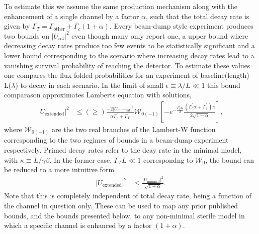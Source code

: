 \documentclass[11pt, a4paper]{article}
\begin{document}
To estimate this we assume the same production mechanism along with the
enhancement of a single channel by a factor $\alpha$, such that the total decay
rate is given by $\Gamma_T = \Gamma_\text{other}+\Gamma_c (1+\alpha)$. Every
beam-dump style experiment produces two bounds on $|U_{\alpha 4}|^2$ even
though many only report one, a upper bound where decreasing decay rates produce
too few events to be statistically significant and a lower bound corresponding
to the scenario where increasing decay rates lead to a vanishing survival
probability of reaching the detector. To estimate these values one compares the
flux folded probabilities for an experiment of baseline(length) L($\lambda$) to
decay in each scenario. In the limit of small $\epsilon \equiv \lambda/L
\ll 1$ this bound comparason approximates Lamberts equation with solutions, 
%
\begin{align*}
|U_\text{extended}|^2 &\leq (\geq) \frac{-2 |U_\text{minimal}|^2}{\alpha
\Gamma^\prime_c +\Gamma^\prime_T}
\mathcal{W}_{0(-1)}\left[-e^{-\frac{\Gamma^\prime_T \kappa}{2}}
\frac{(\Gamma^\prime_c \alpha + \Gamma^\prime_T)\kappa}{2\sqrt{1+\alpha}}
\right],
\end{align*}
% 
where $\mathcal{W}_{0(-1)}$ are the two real branches of the Lambert-W function
corresponding to the two regimes of bounds in a beam-dump experiment
respectively. Primed decay rates refer to the deay rate in the minimal model,
with $\kappa \equiv L/\gamma \beta$. In the former case, $\Gamma_T L \ll 1$
correspondng to $\mathcal{W}_0$, the bound can be reduced to a more intuitive
form \begin{align*} |U_\text{extended}|^2 &\leq
\frac{|U_{\text{minimal}}|^2}{\sqrt{1+\alpha}}.  \end{align*} Note that this is
completely independent of total decay rate, being a function of the channel in
question only.  These can be used to map any prior published bounds, and the
bounds presented below, to any non-minimal sterile model in which a specific
channel is enhanced by a factor $(1+\alpha)$.
\end{document}
